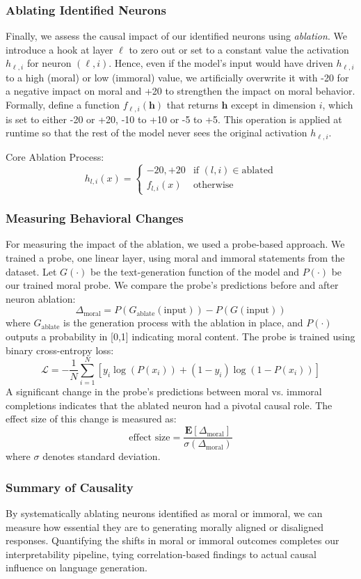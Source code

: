 \documentclass[runninghheads]{llncs}
\begin{document}
\subsubsection{Ablating Identified Neurons}
Finally, we assess the causal impact of our identified neurons using \textit{ablation}. We introduce a hook at layer \(\ell\) to zero out or set to a constant value the activation \(h_{\ell,i}\) for neuron \((\ell,i)\). Hence, even if the model's input would have driven \(h_{\ell,i}\) to a high (moral) or low (immoral) value, we artificially overwrite it with -20 for a negative impact on moral and +20 to strengthen the impact on moral behavior. Formally, define a function \(f_{\ell,i}(\mathbf{h})\) that returns \(\mathbf{h}\) except in dimension \(i\), which is set to either -20 or +20, -10 to +10 or -5 to +5. This operation is applied at runtime so that the rest of the model never sees the original activation \(h_{\ell,i}\).

Core Ablation Process:
$$h_{l,i}(x) = \begin{cases} -20, +20 & \text{if } (l,i) \in \text{ablated} \\ f_{l,i}(x) & \text{otherwise} \end{cases}$$

\subsubsection{Measuring Behavioral Changes}
For measuring the impact of the ablation, we used a probe-based approach. We trained a probe, one linear layer, using moral and immoral statements from the dataset.  Let \(G(\cdot)\) be the text-generation function of the model and \(P(\cdot)\) be our trained moral probe. We compare the probe's predictions before and after neuron ablation:
$$
\Delta_{\text{moral}} = P(G_{\text{ablate}}(\text{input})) - P(G(\text{input}))
$$
where \(G_{\text{ablate}}\) is the generation process with the ablation in place, and \(P(\cdot)\) outputs a probability in [0,1] indicating moral content. The probe is trained using binary cross-entropy loss:
$$\mathcal{L} = -\frac{1}{N}\sum_{i=1}^N [y_i \log(P(x_i)) + (1-y_i)\log(1-P(x_i))]$$
A significant change in the probe's predictions between moral vs. immoral completions indicates that the ablated neuron had a pivotal causal role. The effect size of this change is measured as:
$$\text{effect size} = \frac{\mathbf{E}[\Delta_{\text{moral}}]}{\sigma(\Delta_{\text{moral}})}$$
where \(\sigma\) denotes standard deviation.

\subsubsection{Summary of Causality}  
By systematically ablating neurons identified as moral or immoral, we can measure how essential they are to generating morally aligned or disaligned responses. Quantifying the shifts in moral or immoral outcomes completes our interpretability pipeline, tying correlation-based findings to actual causal influence on language generation.
\end{document}
